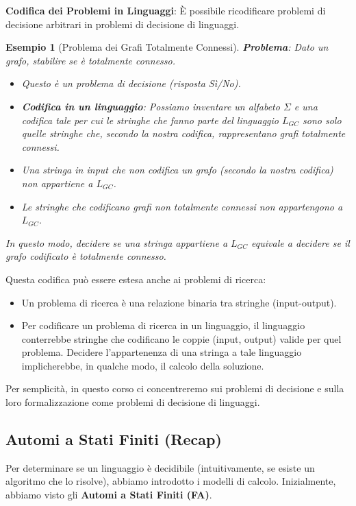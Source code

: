 \documentclass[a4paper]{article}
\newtheorem{example}{Esempio}
\begin{document}
\textbf{Codifica dei Problemi in Linguaggi}:
È possibile ricodificare problemi di decisione arbitrari in problemi di decisione di linguaggi.
\begin{example}[Problema dei Grafi Totalmente Connessi]
    \textbf{Problema}: Dato un grafo, stabilire se è totalmente connesso.
    \begin{itemize}
        \item Questo è un problema di decisione (risposta Sì/No).
        \item \textbf{Codifica in un linguaggio}: Possiamo inventare un alfabeto $\Sigma$ e una codifica tale per cui le stringhe che fanno parte del linguaggio $L_{GC}$ sono solo quelle stringhe che, secondo la nostra codifica, rappresentano grafi totalmente connessi.
        \item Una stringa in input che non codifica un grafo (secondo la nostra codifica) non appartiene a $L_{GC}$.
        \item Le stringhe che codificano grafi non totalmente connessi non appartengono a $L_{GC}$.
    \end{itemize}
    In questo modo, decidere se una stringa appartiene a $L_{GC}$ equivale a decidere se il grafo codificato è totalmente connesso.
\end{example}

Questa codifica può essere estesa anche ai problemi di ricerca:
\begin{itemize}
    \item Un problema di ricerca è una relazione binaria tra stringhe (input-output).
    \item Per codificare un problema di ricerca in un linguaggio, il linguaggio conterrebbe stringhe che codificano le coppie (input, output) valide per quel problema. Decidere l'appartenenza di una stringa a tale linguaggio implicherebbe, in qualche modo, il calcolo della soluzione.
\end{itemize}
Per semplicità, in questo corso ci concentreremo sui problemi di decisione e sulla loro formalizzazione come problemi di decisione di linguaggi.

\subsection{Automi a Stati Finiti (Recap)}
Per determinare se un linguaggio è decidibile (intuitivamente, se esiste un algoritmo che lo risolve), abbiamo introdotto i modelli di calcolo. Inizialmente, abbiamo visto gli \textbf{Automi a Stati Finiti (FA)}.
\end{document}
